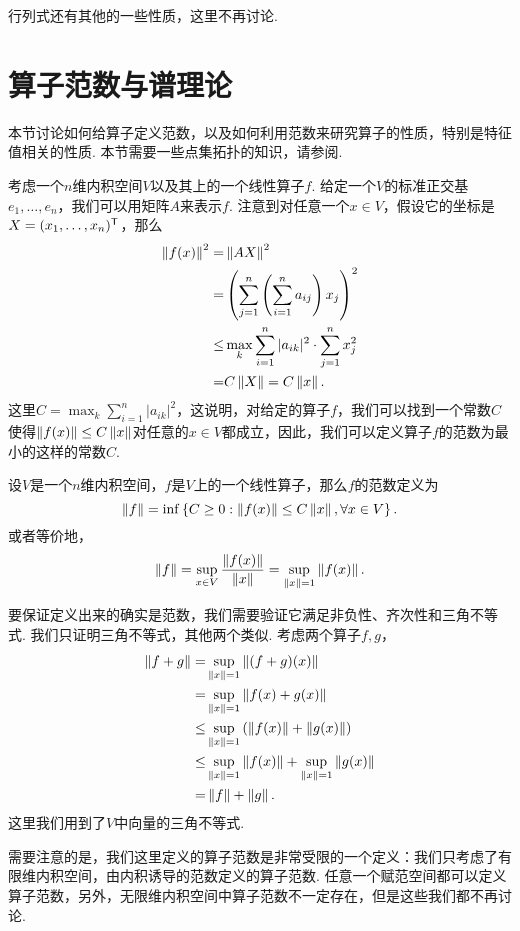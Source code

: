 行列式还有其他的一些性质，这里不再讨论. 

\section{算子范数与谱理论}

本节讨论如何给算子定义范数，以及如何利用范数来研究算子的性质，特别是特征值相关的性质. 本节需要一些点集拓扑的知识，请参阅.

考虑一个$n$维内积空间$V$以及其上的一个线性算子$f$. 给定一个$V$的标准正交基$e_1,\dots,e_n$，我们可以用矩阵$A$来表示$f$. 注意到对任意一个$x\in V$，假设它的坐标是$X=(x_1,\dots,x_n)^{\mathsf{T}}$，那么
\begin{align*}
    \left\|f(x)\right\|^2=&\left\|AX\right\|^2\\
    =&\left(\sum_{j=1}^n\left(\sum_{i=1}^na_{ij}\right)x_j\right)^2\\
    \leq &\max_{k}\sum_{i=1}^n|a_{ik}|^2\cdot\sum_{j=1}^n x_j^2\\
    =&C\left\|X\right\|=C\left\|x\right\|.
\end{align*}
这里$C=\max_{k}\sum_{i=1}^n|a_{ik}|^2$，这说明，对给定的算子$f$，我们可以找到一个常数$C$使得$\left\|f(x)\right\|\leq C\left\|x\right\|$对任意的$x\in V$都成立，因此，我们可以定义算子$f$的范数为最小的这样的常数$C$. 

\begin{definition}[算子范数]
    设$V$是一个$n$维内积空间，$f$是$V$上的一个线性算子，那么$f$的范数定义为
    \[\left\|f\right\|=\inf\left\{C\geq 0:\left\|f(x)\right\|\leq C\left\|x\right\|,\forall x\in V\right\}.\]
或者等价地，
\[\left\|f\right\|=\sup_{x\in V}\frac{\left\|f(x)\right\|}{\left\|x\right\|}=\sup_{\left\|x\right\|=1}\left\|f(x)\right\|.\]
\end{definition}
要保证定义出来的确实是范数，我们需要验证它满足非负性、齐次性和三角不等式. 我们只证明三角不等式，其他两个类似. 考虑两个算子$f,g$，
\begin{align*}
    \left\|f+g\right\|=&\sup_{\left\|x\right\|=1}\left\|(f+g)(x)\right\|\\
    =&\sup_{\left\|x\right\|=1}\left\|f(x)+g(x)\right\|\\
    \leq&\sup_{\left\|x\right\|=1}\left(\left\|f(x)\right\|+\left\|g(x)\right\|\right)\\
    \leq&\sup_{\left\|x\right\|=1}\left\|f(x)\right\|+\sup_{\left\|x\right\|=1}\left\|g(x)\right\|\\
    =&\left\|f\right\|+\left\|g\right\|.
\end{align*}
这里我们用到了$V$中向量的三角不等式. 

需要注意的是，我们这里定义的算子范数是非常受限的一个定义：我们只考虑了有限维内积空间，由内积诱导的范数定义的算子范数. 任意一个赋范空间都可以定义算子范数，另外，无限维内积空间中算子范数不一定存在，但是这些我们都不再讨论. 

